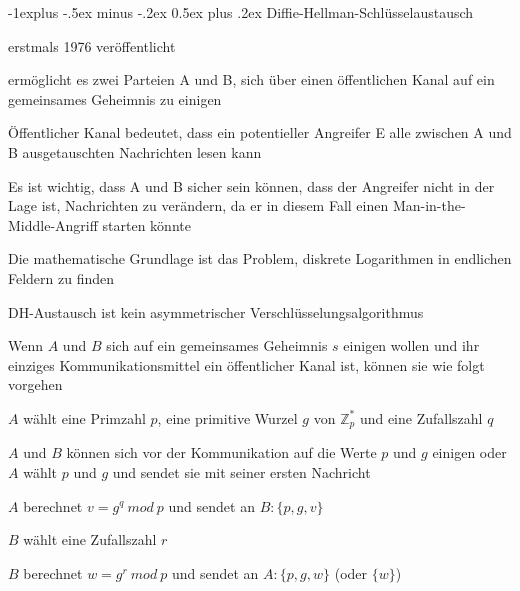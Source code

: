 \documentclass[a4paper]{article}
\makeatletter
\renewcommand{\subsection}{\@startsection{subsection}{2}{0mm}%
 {-1explus -.5ex minus -.2ex}%
 {0.5ex plus .2ex}%
 {\normalfont\normalsize\bfseries}}
\makeatother
\begin{document}
\begin{multicols}{3}
      \subsection{Diffie-Hellman-Schlüsselaustausch}
      \begin{itemize*}
            \item erstmals 1976 veröffentlicht%
            \item ermöglicht es zwei Parteien A und B, sich über einen öffentlichen Kanal auf ein gemeinsames Geheimnis zu einigen
            \item Öffentlicher Kanal bedeutet, dass ein potentieller Angreifer E alle zwischen A und B ausgetauschten Nachrichten lesen kann
            \item Es ist wichtig, dass A und B sicher sein können, dass der Angreifer nicht in der Lage ist, Nachrichten zu verändern, da er in diesem Fall einen Man-in-the-Middle-Angriff starten könnte
            \item Die mathematische Grundlage ist das Problem, diskrete Logarithmen in endlichen Feldern zu finden
            \item DH-Austausch ist kein asymmetrischer Verschlüsselungsalgorithmus
            \item Wenn $A$ und $B$ sich auf ein gemeinsames Geheimnis $s$ einigen wollen und ihr einziges Kommunikationsmittel ein öffentlicher Kanal ist, können sie wie folgt vorgehen
            \begin{itemize*}
                  \item $A$ wählt eine Primzahl $p$, eine primitive Wurzel $g$ von $\mathbb{Z}^*_p$ und eine Zufallszahl $q$
                  \begin{itemize*}
                        \item $A$ und $B$ können sich vor der Kommunikation auf die Werte $p$ und $g$ einigen oder $A$ wählt $p$ und $g$ und sendet sie mit seiner ersten Nachricht
                        \item $A$ berechnet $v=g^q\ mod\ p$ und sendet an $B:\{p,g,v\}$
                  \end{itemize*}
                  \item $B$ wählt eine Zufallszahl $r$
                  \begin{itemize*}
                        \item $B$ berechnet $w=g^r\ mod\ p$ und sendet an $A:\{p,g,w\}$ (oder $\{w\}$)
                  \end{itemize*}

\end{itemize*}
\end{itemize*}
\end{multicols}
\end{document}
